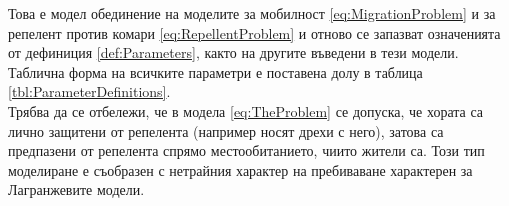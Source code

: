 Това е модел обединение на моделите за мобилност \eqref{eq:MigrationProblem} и за репелент против комари \eqref{eq:RepellentProblem} и отново се запазват означенията от дефиниция \ref{def:Parameters}, както на другите въведени в тези модели.
Таблична форма на всичките параметри е поставена долу в таблица \ref{tbl:ParameterDefinitions}. \\
Трябва да се отбележи, че в модела \eqref{eq:TheProblem} се допуска, че хората са лично защитени от репелента (например носят дрехи с него), затова са предпазени от репелента спрямо местообитанието, чиито жители са.
Този тип моделиране е съобразен с нетрайния характер на пребиваване характерен за Лагранжевите модели.

